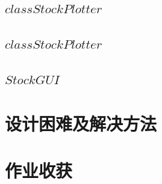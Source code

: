 \documentclass{ctexart}
\begin{document}
\subsection{$class StockPlotter$}

\subsection{$class StockPlotter$}
\subsection{$StockGUI$}

\section{设计困难及解决方法}
\section{作业收获}
\end{document}
